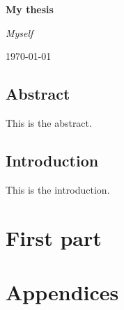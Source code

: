\documentclass[a4paper,twoside,12pt]{book}
\newcommand\newpart[1]{
\part*{#1}
}
\begin{document}
\frontmatter
\pagestyle{fancyempty}



\begin{titlepage}
	\centering
	\vspace*{6cm}
	{\Huge\bfseries My thesis\par}
	\vspace{4cm}
	{\Large\itshape Myself\par}

	\vfill

	{\large \today\par}
\end{titlepage}





\thispagestyle{empty}

\newpage

\dominitoc

\setcounter{page}{1}
\chapter*{Abstract}
\mtcaddchapter[Abstract]

This is the abstract.

\cleardoublepage
\setcounter{tocdepth}{1}
\markboth{}{}
\tableofcontents
\markboth{}{}

\fakelistoffigures
\fakelistoftables




\mainmatter

\markboth{}{}
\chapter*{Introduction}
\mtcaddchapter[Introduction]

This is the introduction.


\adjustmtc
\newpart{First part}
\setcounter{mtc}{3}



\markboth{}{}
\newpart{Appendices}
\appendix

\backmatter
\cleardoublepage
{}
\thispagestyle{plain}

\adjustmtc

\end{document}
